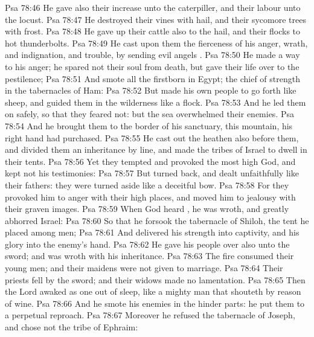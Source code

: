 \vs Psa 78:46 He gave also their increase unto the caterpiller, and their labour unto the locust.
\vs Psa 78:47 He destroyed their vines with hail, and their sycomore trees with frost.
\vs Psa 78:48 He gave up their cattle also to the hail, and their flocks to hot thunderbolts.
\vs Psa 78:49 He cast upon them the fierceness of his anger, wrath, and indignation, and trouble, by sending evil angels .
\vs Psa 78:50 He made a way to his anger; he spared not their soul from death, but gave their life over to the pestilence;
\vs Psa 78:51 And smote all the firstborn in Egypt; the chief of  strength in the tabernacles of Ham:
\vs Psa 78:52 But made his own people to go forth like sheep, and guided them in the wilderness like a flock.
\vs Psa 78:53 And he led them on safely, so that they feared not: but the sea overwhelmed their enemies.
\vs Psa 78:54 And he brought them to the border of his sanctuary,  this mountain,  his right hand had purchased.
\vs Psa 78:55 He cast out the heathen also before them, and divided them an inheritance by line, and made the tribes of Israel to dwell in their tents.
\vs Psa 78:56 Yet they tempted and provoked the most high God, and kept not his testimonies:
\vs Psa 78:57 But turned back, and dealt unfaithfully like their fathers: they were turned aside like a deceitful bow.
\vs Psa 78:58 For they provoked him to anger with their high places, and moved him to jealousy with their graven images.
\vs Psa 78:59 When God heard , he was wroth, and greatly abhorred Israel:
\vs Psa 78:60 So that he forsook the tabernacle of Shiloh, the tent  he placed among men;
\vs Psa 78:61 And delivered his strength into captivity, and his glory into the enemy's hand.
\vs Psa 78:62 He gave his people over also unto the sword; and was wroth with his inheritance.
\vs Psa 78:63 The fire consumed their young men; and their maidens were not given to marriage.
\vs Psa 78:64 Their priests fell by the sword; and their widows made no lamentation.
\vs Psa 78:65 Then the Lord awaked as one out of sleep,  like a mighty man that shouteth by reason of wine.
\vs Psa 78:66 And he smote his enemies in the hinder parts: he put them to a perpetual reproach.
\vs Psa 78:67 Moreover he refused the tabernacle of Joseph, and chose not the tribe of Ephraim:
